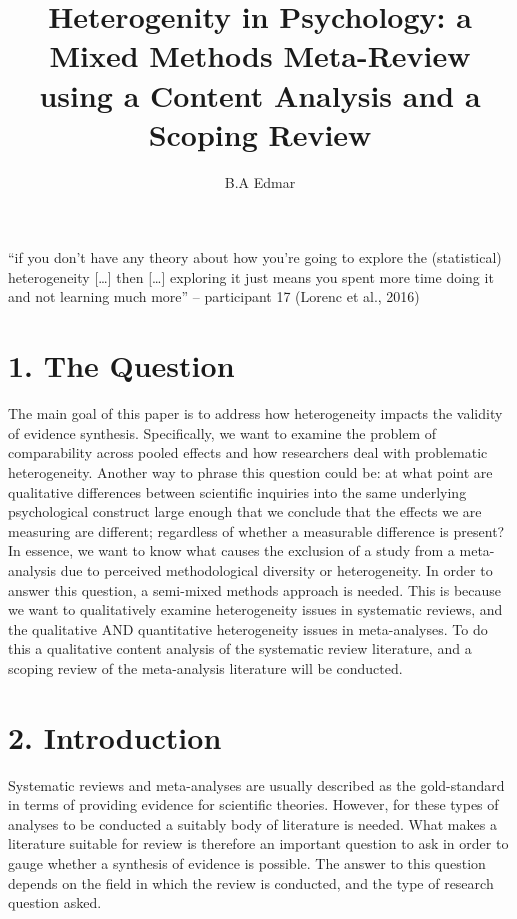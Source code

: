 \documentclass[
  letterpaper,
  DIV=11,
  numbers=noendperiod]{scrartcl}
\title{Heterogenity in Psychology: a Mixed Methods Meta-Review using a
Content Analysis and a Scoping Review}
\author{B.A Edmar}
\date{}
\begin{document}
\maketitle
\ifdefined\Shaded\renewenvironment{Shaded}{\begin{tcolorbox}[frame hidden, sharp corners, interior hidden, borderline west={3pt}{0pt}{shadecolor}, breakable, boxrule=0pt, enhanced]}{\end{tcolorbox}}\fi

``if you don't have any theory about how you're going to explore the
(statistical) heterogeneity {[}\ldots{]} then {[}\ldots{]} exploring it
just means you spent more time doing it and not learning much more'' --
participant 17 (Lorenc et al., 2016)

\hypertarget{the-question}{%
\section{1. The Question}\label{the-question}}

The main goal of this paper is to address how heterogeneity impacts the
validity of evidence synthesis. Specifically, we want to examine the
problem of comparability across pooled effects and how researchers deal
with problematic heterogeneity. Another way to phrase this question
could be: at what point are qualitative differences between scientific
inquiries into the same underlying psychological construct large enough
that we conclude that the effects we are measuring are different;
regardless of whether a measurable difference is present? In essence, we
want to know what causes the exclusion of a study from a meta-analysis
due to perceived methodological diversity or heterogeneity. In order to
answer this question, a semi-mixed methods approach is needed. This is
because we want to qualitatively examine heterogeneity issues in
systematic reviews, and the qualitative AND quantitative heterogeneity
issues in meta-analyses. To do this a qualitative content analysis of
the systematic review literature, and a scoping review of the
meta-analysis literature will be conducted.

\hypertarget{introduction}{%
\section{2. Introduction}\label{introduction}}

Systematic reviews and meta-analyses are usually described as the
gold-standard in terms of providing evidence for scientific theories.
However, for these types of analyses to be conducted a suitably body of
literature is needed. What makes a literature suitable for review is
therefore an important question to ask in order to gauge whether a
synthesis of evidence is possible. The answer to this question depends
on the field in which the review is conducted, and the type of research
question asked.
\end{document}
